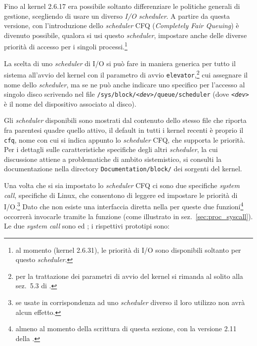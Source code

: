 Fino al kernel 2.6.17 era possibile soltanto differenziare le politiche
generali di gestione, scegliendo di usare un diverso \textit{I/O scheduler}. A
partire da questa versione, con l'introduzione dello \textit{scheduler} CFQ
(\textit{Completely Fair Queuing}) è divenuto possibile, qualora si usi questo
\textit{scheduler}, impostare anche delle diverse priorità di accesso per i
singoli processi.\footnote{al momento (kernel 2.6.31), le priorità di I/O sono
  disponibili soltanto per questo \textit{scheduler}.}

La scelta di uno \textit{scheduler} di I/O si può fare in maniera generica per
tutto il sistema all'avvio del kernel con il parametro di avvio
\texttt{elevator},\footnote{per la trattazione dei parametri di avvio del
  kernel si rimanda al solito alla sez.~5.3 di \cite{AGL}.} cui assegnare il
nome dello \textit{scheduler}, ma se ne può anche indicare uno specifico per
l'accesso al singolo disco scrivendo nel file
\texttt{/sys/block/\textit{<dev>}/queue/scheduler} (dove
\texttt{\textit{<dev>}} è il nome del dispositivo associato al disco).

Gli \textit{scheduler} disponibili sono mostrati dal contenuto dello stesso
file che riporta fra parentesi quadre quello attivo, il default in tutti i
kernel recenti è proprio il \texttt{cfq}, nome con cui si indica appunto lo
\textit{scheduler} CFQ, che supporta le priorità. Per i dettagli sulle
caratteristiche specifiche degli altri \textit{scheduler}, la cui discussione
attiene a problematiche di ambito sistemistico, si consulti la documentazione
nella directory \texttt{Documentation/block/} dei sorgenti del kernel.

Una volta che si sia impostato lo \textit{scheduler} CFQ ci sono due
specifiche \textit{system call}, specifiche di Linux, che consentono di
leggere ed impostare le priorità di I/O.\footnote{se usate in corrispondenza
  ad uno \textit{scheduler} diverso il loro utilizzo non avrà alcun effetto.}
Dato che non esiste una interfaccia diretta nella  per queste due
funzioni\footnote{almeno al momento della scrittura di questa sezione, con la
  versione 2.11 della .} occorrerà invocarle tramite la funzione
 (come illustrato in sez.~\ref{sec:proc_syscall}). Le due
\textit{system call} sono  ed ; i
rispettivi prototipi sono:

